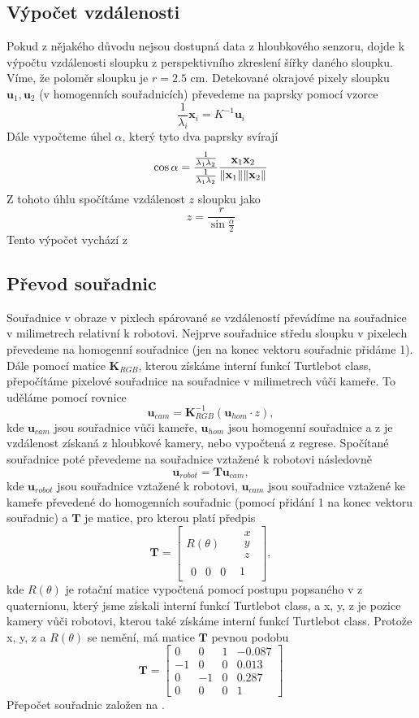 \documentclass{article}
\begin{document}
\subsection{Výpočet vzdálenosti}
Pokud z nějakého důvodu nejsou dostupná data z hloubkového senzoru, dojde k výpočtu vzdálenosti sloupku z perspektivního zkreslení šířky daného sloupku. Víme, že poloměr sloupku je $r = 2.5$ cm. Detekované okrajové pixely sloupku $\mathbf{u}_1, \mathbf{u}_2$ (v homogenních souřadnicích) převedeme na paprsky pomocí vzorce
$$\frac{1}{\lambda_i} \mathbf{x}_i = K^{-1} \mathbf{u}_i$$
Dále vypočteme úhel $\alpha$, který tyto dva paprsky svírají
$$\cos{\alpha} = \frac{\frac{1}{\lambda_1 \lambda_2}}{\frac{1}{\lambda_1 \lambda_2}}\frac{\mathbf{x}_1 \mathbf{x}_2}{\norm{\mathbf{x}_1} \norm{\mathbf{x}_2}}$$
Z tohoto úhlu spočítáme vzdálenost $z$ sloupku jako
$$z = \frac{r}{\sin{\frac{\alpha}{2}}}$$
Tento výpočet vychází z \cite{prezentace}
\subsection{Převod souřadnic}
Souřadnice v obraze v pixlech spárované se vzdáleností převádíme na souřadnice v milimetrech relativní k robotovi. Nejprve souřadnice středu sloupku v pixelech převedeme na homogenní souřadnice (jen na konec vektoru souřadnic přidáme 1). Dále pomocí matice $\mathbf{K}_{RGB}$, kterou získáme interní funkcí Turtlebot class, přepočítáme pixelové souřadnice na souřadnice v milimetrech vůči kameře. To uděláme pomocí rovnice
$$\mathbf{u}_{cam} = \mathbf{K}_{RGB}^{-1} (\mathbf{u}_{hom} \cdot z),$$
kde $\mathbf{u}_{cam}$ jsou souřadnice vůči kameře, $\mathbf{u}_{hom}$ jsou homogenní souřadnice a z je vzdálenost získaná z hloubkové kamery, nebo vypočtená z regrese.
Spočítané souřadnice poté převedeme na souřadnice vztažené k robotovi následovně
$$\mathbf{u}_{robot} = \mathbf{T} \mathbf{u}_{cam},$$
kde $\mathbf{u}_{robot}$ jsou souřadnice vztažené k robotovi, $\mathbf{u}_{cam}$ jsou souřadnice vztažené ke kameře převedené do homogenních souřadnic (pomocí přidání 1 na konec vektoru souřadnic) a $\mathbf{T}$ je matice, pro kterou platí předpis
$$\mathbf{T} =
\begin{bmatrix}
R(\theta) & \begin{matrix}
x \\ y \\ z
\end{matrix}\\
\begin{matrix}
0 & 0 & 0
\end{matrix} & 1
\end{bmatrix},
$$
kde $R(\theta)$ je rotační matice vypočtená pomocí postupu popsaného v \cite{quaterniony} z quaternionu, který jsme získali interní funkcí Turtlebot class, a x, y, z je pozice kamery vůči robotovi, kterou také získáme interní funkcí Turtlebot class. Protože x, y, z a $R(\theta)$ se nemění, má matice $\mathbf{T}$ pevnou podobu
$$\mathbf{T} =
\begin{bmatrix}
0 & 0 & 1 & -0.087 \\
-1 & 0 & 0 & 0.013 \\
0 & -1 & 0 & 0.287 \\
0 & 0 & 0 & 1
\end{bmatrix}
$$
Přepočet souřadnic založen na \cite{prezentace}.
\end{document}

